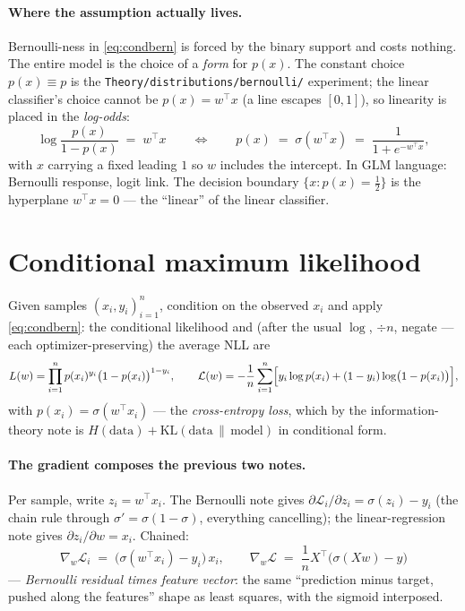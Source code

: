 \documentclass[11pt]{article}
\newcommand{\sig}{\sigma}
\begin{document}
\paragraph{Where the assumption actually lives.}
Bernoulli-ness in \eqref{eq:condbern} is forced by the binary support and
costs nothing. The entire model is the choice of a \emph{form} for
$p(x)$. The constant choice $p(x)\equiv p$ is the \texttt{Theory/distributions/bernoulli/}
experiment; the linear classifier's choice cannot be
$p(x) = w^\top x$ (a line escapes $[0,1]$), so linearity is placed in the
\emph{log-odds}:
\begin{equation}
  \log\frac{p(x)}{1-p(x)} \;=\; w^\top x
  \qquad\Longleftrightarrow\qquad
  p(x) \;=\; \sig(w^\top x) \;=\; \frac{1}{1+e^{-w^\top x}},
  \label{eq:logit}
\end{equation}
with $x$ carrying a fixed leading $1$ so $w$ includes the intercept. In
GLM language: Bernoulli response, logit link. The decision boundary
$\{x : p(x) = \tfrac12\}$ is the hyperplane $w^\top x = 0$ --- the
``linear'' of the linear classifier.

\section{Conditional maximum likelihood}

Given samples $(x_i, y_i)_{i=1}^n$, condition on the observed $x_i$ and
apply \eqref{eq:condbern}: the conditional likelihood and (after the
usual $\log$, $\div n$, negate --- each optimizer-preserving) the average
NLL are
\begin{equation}
  L(w) = \prod_{i=1}^n p(x_i)^{y_i}\bigl(1-p(x_i)\bigr)^{1-y_i},
  \qquad
  \mathcal{L}(w)
  = -\frac1n\sum_{i=1}^n
  \Bigl[y_i\log p(x_i) + (1-y_i)\log\bigl(1-p(x_i)\bigr)\Bigr],
  \label{eq:nll}
\end{equation}
with $p(x_i) = \sig(w^\top x_i)$ --- the \emph{cross-entropy loss},
which by the information-theory note is
$H(\text{data}) + \mathrm{KL}(\text{data}\,\|\,\text{model})$ in
conditional form.

\paragraph{The gradient composes the previous two notes.}
Per sample, write $z_i = w^\top x_i$. The Bernoulli note gives
$\partial \mathcal{L}_i/\partial z_i = \sig(z_i) - y_i$
(the chain rule through $\sig' = \sig(1-\sig)$, everything cancelling);
the linear-regression note gives $\partial z_i/\partial w = x_i$. Chained:
\begin{equation}
  \nabla_w \mathcal{L}_i
  \;=\; \bigl(\sig(w^\top x_i) - y_i\bigr)\, x_i ,
  \qquad
  \nabla_w \mathcal{L}
  \;=\; \frac1n X^\top\bigl(\sig(Xw) - y\bigr)
  \label{eq:grad}
\end{equation}
--- \emph{Bernoulli residual times feature vector}: the same
``prediction minus target, pushed along the features'' shape as least
squares, with the sigmoid interposed.
\end{document}

